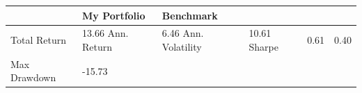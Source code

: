 \begin{tabular}{lll}
\toprule
 & My Portfolio & Benchmark \\
\midrule
Total Return & 13.66%
Ann. Return & 6.46%
Ann. Volatility & 10.61%
Sharpe & 0.61 & 0.40 \\
Max Drawdown & -15.73%
\bottomrule
\end{tabular}
